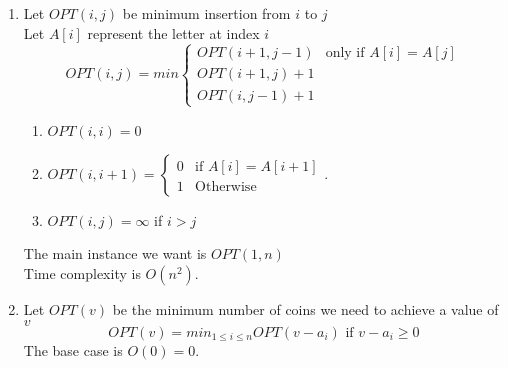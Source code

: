\documentclass{article}
\begin{document}
\begin{enumerate}
\item 
Let $OPT(i,j)$ be minimum insertion from $i$ to $j$ \\
Let $A[i]$ represent the letter at index $i$\\
\begin{equation}
OPT(i,j) = min
\begin{cases}
OPT(i+1,j-1)  &\text{only if } A[i] = A[j] \\
OPT(i+1,j) + 1 \\
OPT(i,j-1) + 1
\end{cases}
\end{equation}
\begin{enumerate}
\item $OPT(i,i) = 0$ \\
\item $OPT(i, i+1) = \begin{cases}
						0 &\text{if } A[i] = A[i+1] \\
					1 &\text{Otherwise}
					\end{cases}$.\\
\item $OPT(i,j) = \infty$ if $i>j$
\end{enumerate} 
The main instance we want is $OPT(1,n)$\\
Time complexity is $O(n^2)$.\\


\item
Let $OPT(v)$ be the minimum number of coins we need to achieve a value of $v$\\
\begin{equation}
OPT(v) = min_{1 \leqslant i \leqslant n} OPT(v-a_i) \text{ if } v-a_i \geqslant 0
\end{equation}
The base case is $O(0) = 0$.\\


\end{enumerate}
\end{document}
